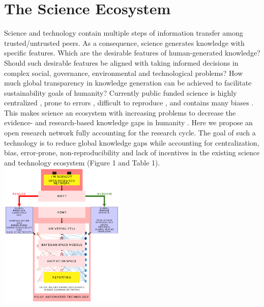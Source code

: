 \documentclass[10pt, a4paper, twocolumn]{article} %
\begin{document}
{ 
\section{The Science Ecosystem}
Science and technology contain multiple steps of information transfer
among trusted/untrusted peers. As a consequence, science generates
knowledge with specific features. Which are the desirable features of
human-generated knowledge? Should such desirable features be aligned
with taking informed decisions in complex social, governance,
environmental and technological problems? How much global transparency
in knowledge generation can be achieved to facilitate sustainability
goals of humanity? Currently public funded science is highly
centralized \citep{Inhaber1977,Gunther2018}⁠⁠, prone to errors
\citep{Fang2011}, difficult to reproduce \citep{Hardwicke2018}, and
contains many biases \citep{Ioannidis2005}. This makes science an
ecosystem with increasing problems to decrease the evidence- and
research-based knowledge gaps in humanity
\citep{Mastrangelo2019}. Here we propose an open research network
fully accounting for the research cycle. The goal of such a technology
is to reduce global knowledge gaps while accounting for
centralization, bias, error-prone, non-reproducibility and lack of
incentives in the existing science and technology ecosystem (Figure 1
and Table 1).
\includegraphics[width=0.45\textwidth]{flowchart.pdf}

}
\end{document}
